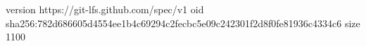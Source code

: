 version https://git-lfs.github.com/spec/v1
oid sha256:782d686605d4554ee1b4c69294c2fecbc5e09c242301f2d8f0fe81936c4334c6
size 1100
